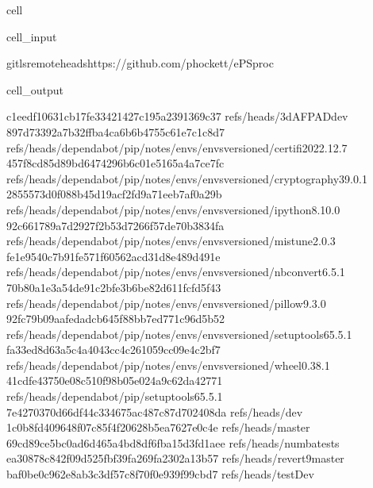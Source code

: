 \documentclass[letterpaper,table,10pt,english]{jupyterBook}
\begin{document}
\begin{sphinxuseclass}{cell}\begin{sphinxVerbatimInput}

\begin{sphinxuseclass}{cell_input}
\begin{sphinxVerbatim}[commandchars=\\\{\}]
gitls\PYGZhy{}remote\PYGZhy{}\PYGZhy{}headshttps://github.com/phockett/ePSproc
\end{sphinxVerbatim}

\end{sphinxuseclass}\end{sphinxVerbatimInput}
\begin{sphinxVerbatimOutput}

\begin{sphinxuseclass}{cell_output}
\begin{sphinxVerbatim}[commandchars=\\\{\}]
c1eedf10631cb17fe33421427c195a2391369c37	refs/heads/3d\PYGZhy{}AFPAD\PYGZhy{}dev
897d73392a7b32ffba4ca6b6b4755c61e7c1c8d7	refs/heads/dependabot/pip/notes/envs/envs\PYGZhy{}versioned/certifi\PYGZhy{}2022.12.7
457f8cd85d89bd6474296b6c01e5165a4a7ce7fc	refs/heads/dependabot/pip/notes/envs/envs\PYGZhy{}versioned/cryptography\PYGZhy{}39.0.1
2855573d0f088b45d19acf2fd9a71eeb7af0a29b	refs/heads/dependabot/pip/notes/envs/envs\PYGZhy{}versioned/ipython\PYGZhy{}8.10.0
92c661789a7d2927f2b53d7266f57de70b3834fa	refs/heads/dependabot/pip/notes/envs/envs\PYGZhy{}versioned/mistune\PYGZhy{}2.0.3
fe1e9540c7b91fe571f60562acd31d8e489d491e	refs/heads/dependabot/pip/notes/envs/envs\PYGZhy{}versioned/nbconvert\PYGZhy{}6.5.1
70b80a1e3a54de91c2bfe3b6be82d611fcfd5f43	refs/heads/dependabot/pip/notes/envs/envs\PYGZhy{}versioned/pillow\PYGZhy{}9.3.0
92fc79b09aafedadcb645f88bb7ed771c96d5b52	refs/heads/dependabot/pip/notes/envs/envs\PYGZhy{}versioned/setuptools\PYGZhy{}65.5.1
fa33ed8d63a5c4a4043cc4c261059cc09e4c2bf7	refs/heads/dependabot/pip/notes/envs/envs\PYGZhy{}versioned/wheel\PYGZhy{}0.38.1
41cdfe43750e08c510f98b05e024a9c62da42771	refs/heads/dependabot/pip/setuptools\PYGZhy{}65.5.1
7e4270370d66df44c334675ac487c87d702408da	refs/heads/dev
1c0b8fd409648f07c85f4f20628b5ea7627e0c4e	refs/heads/master
69cd89ce5bc0ad6d465a4bd8df6fba15d3fd1aee	refs/heads/numba\PYGZhy{}tests
ea30878c842f09d525fbf39fa269fa2302a13b57	refs/heads/revert\PYGZhy{}9\PYGZhy{}master
baf0be0c962e8ab3c3df57c8f70f0e939f99cbd7	refs/heads/testDev
\end{sphinxVerbatim}

\end{sphinxuseclass}\end{sphinxVerbatimOutput}

\end{sphinxuseclass}
\end{document}
